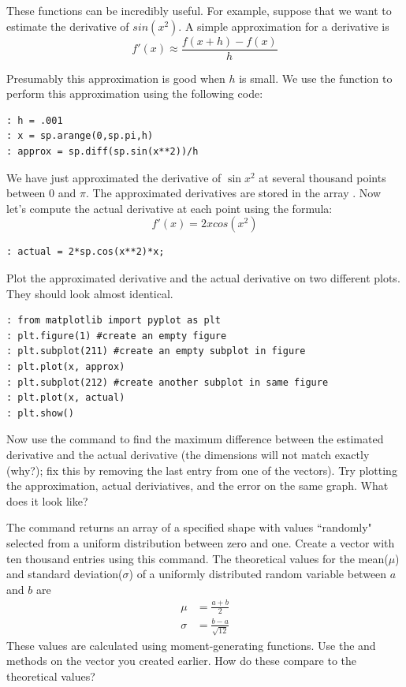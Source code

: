 These functions can be incredibly useful. For example, suppose that we want to
estimate the derivative of $sin(x^2)$. A simple approximation for a derivative
is
\[
f'(x) \approx \frac{f(x+h) - f(x)}{h}
\]

Presumably this approximation is good when $h$ is small. We use the 
function to perform this approximation using the following code:

\begin{lstlisting}
: h = .001
: x = sp.arange(0,sp.pi,h)
: approx = sp.diff(sp.sin(x**2))/h
\end{lstlisting}

We have just approximated the derivative of $\sin{x^2}$ at several thousand points between $0$ and $\pi$.  The approximated derivatives are stored in the array .  Now let's compute the actual derivative at each point using the formula:
\[
f'(x) = 2x cos(x^2)
\]
\begin{lstlisting}
: actual = 2*sp.cos(x**2)*x;
\end{lstlisting}

Plot the approximated derivative and the actual derivative on two different
plots.  They should look almost identical.
\begin{lstlisting}
: from matplotlib import pyplot as plt
: plt.figure(1) #create an empty figure
: plt.subplot(211) #create an empty subplot in figure
: plt.plot(x, approx)
: plt.subplot(212) #create another subplot in same figure
: plt.plot(x, actual)
: plt.show()
\end{lstlisting}

\begin{problem}
Now use the  command to find the maximum difference between the estimated derivative and the actual derivative
(the dimensions will not match exactly (why?);  fix this by removing
the last entry from one of the vectors).  Try plotting the approximation, actual deriviatives, and the error on the same graph.  What does it look like?
\end{problem}

\begin{problem}
The command  returns an array of a specified shape with values ``randomly" selected from a uniform distribution between zero and one. Create a  vector with ten thousand entries using this command. The theoretical values for the mean($\mu$)
and standard deviation($\sigma$) of a uniformly distributed random variable
between $a$ and $b$ are
\begin{align*}
\mu &= \frac{a+b}{2} \\
\sigma &= \frac{b-a}{\sqrt{12}}
\end{align*}
These values are calculated using moment-generating functions. Use the 
 and  methods on the vector you created earlier. How do these compare to the theoretical values?
\end{problem}

